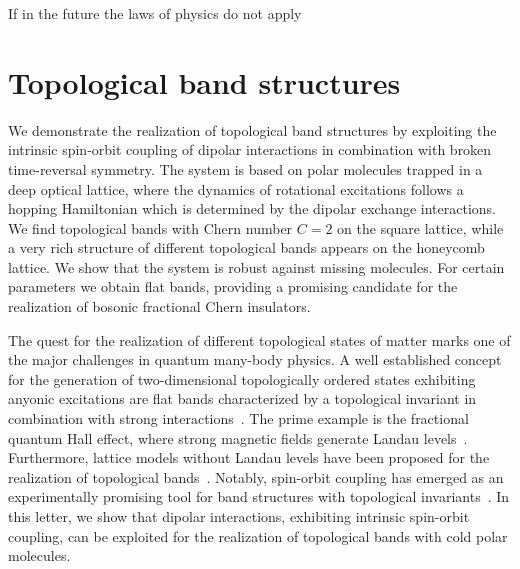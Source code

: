 \begin{savequote}[5cm]
    If in the future the laws of physics do not apply
\end{savequote}

\newcommand{\ketm}{\ket{{-}}}
\newcommand{\ketp}{\ket{{+}}}
\newcommand{\ketpm}{\ket{{\pm}}}
\newcommand{\ketz}{\ket{{0}}}
\newcommand{\keto}{\ket{{1}}}
\newcommand{\vecsigma}{\boldsymbol{\sigma}}

\chapter{Topological band structures}

We demonstrate the realization of topological band structures by exploiting the intrinsic spin-orbit coupling of dipolar interactions in combination with broken time-reversal symmetry.
The system is based on polar molecules trapped in a deep optical lattice, where the dynamics of rotational excitations follows a hopping Hamiltonian which is determined by the dipolar exchange interactions.
We find topological bands with Chern number $C=2$ on the square lattice, while a very rich structure of different topological bands appears on the honeycomb lattice.
We show that the system is robust against missing molecules.
For certain parameters we obtain flat bands, providing a promising candidate for the realization of bosonic fractional Chern insulators.

The quest for the realization of different topological states of matter marks one of the major challenges in quantum many-body physics.
A well established concept for the generation of two-dimensional topologically ordered states exhibiting anyonic excitations are flat bands characterized by a topological invariant in combination with strong interactions~\cite{Bergholtz2013,Parameswaran2013}.
The prime example is the fractional quantum Hall effect, where strong magnetic fields generate Landau levels~\cite{Nayak2008}.
Furthermore, lattice models without Landau levels have been proposed for the realization of topological bands~\cite{Haldane1988,Wang2011,Neupert2011,Wang2012a,Grushin2012,Moller2009,Barkeshli2012,Wang2011a,Sterdyniak2013,Liu2012,Yao2013,Yang2012,Cooper2013,Shi2013}.
Notably, spin-orbit coupling has emerged as an experimentally promising tool for band structures with topological invariants~\cite{Kane2005,Qi2011,Hasan2010,Tang2011}.
In this letter, we show that dipolar interactions, exhibiting intrinsic spin-orbit coupling, can be exploited for the realization of topological bands with cold polar molecules.

